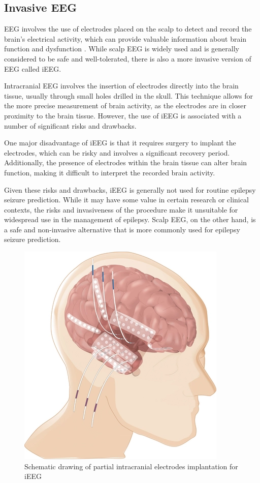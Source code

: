 \subsection{Invasive EEG}
\gls{EEG} involves the use of electrodes placed on the scalp to detect and record the brain's electrical activity, which can provide valuable information about brain function and dysfunction \cite{mercier_advances_2022}. While scalp \gls{EEG} is widely used and is generally considered to be safe and well-tolerated, there is also a more invasive version of \gls{EEG} called \gls{iEEG}.

Intracranial EEG involves the insertion of electrodes directly into the brain tissue, usually through small holes drilled in the skull. This technique allows for the more precise measurement of brain activity, as the electrodes are in closer proximity to the brain tissue. However, the use of \gls{iEEG} is associated with a number of significant risks and drawbacks.

One major disadvantage of \gls{iEEG} is that it requires surgery to implant the electrodes, which can be risky and involves a significant recovery period. Additionally, the presence of electrodes within the brain tissue can alter brain function, making it difficult to interpret the recorded brain activity.

Given these risks and drawbacks, \gls{iEEG} is generally not used for routine epilepsy seizure prediction. While it may have some value in certain research or clinical contexts, the risks and invasiveness of the procedure make it unsuitable for widespread use in the management of epilepsy. Scalp EEG, on the other hand, is a safe and non-invasive alternative that is more commonly used for epilepsy seizure prediction.

\begin{figure}[ht]
    \centering
    \includegraphics[scale=0.5]{images/State-of-art/intracranialEEG.png}
    \caption{Schematic drawing of partial intracranial electrodes implantation for \gls{iEEG} \cite{surbeck_combination_2011}}
    \label{fig:intracranialEEG}
\end{figure}

